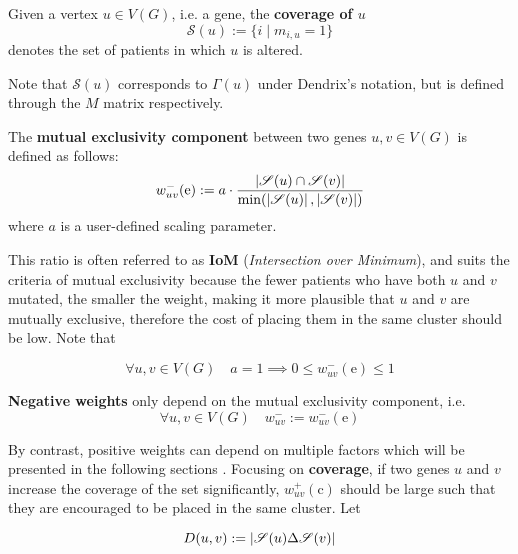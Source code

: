 \begin{definition}
    Given a vertex $u \in V(G)$, i.e. a gene, the \textbf{coverage of $u$} $$\mathscr{S}(u) := \{i \mid m_{i, u} = 1\}$$ denotes the set of patients in which $u$ is altered.
\end{definition}

Note that $\mathscr{S}(u)$ corresponds to $\Gamma(u)$ under Dendrix's notation, but is defined through the $M$ matrix respectively.

\begin{definition} \label{me_comp}
    The \textbf{mutual exclusivity component} between two genes $u, v \in V(G)$ is defined as follows: $$w_{uv}^-(\mathrm e) := a \cdot \dfrac{\left|\mathscr{S}(u) \cap \mathscr{S}(v)\right|}{\min(\left|\mathscr{S}(u)\right|, \left|\mathscr{S}(v)\right|)}$$ where $a$ is a user-defined scaling parameter.
\end{definition}

This ratio is often referred to as \textbf{IoM} (\textit{Intersection over Minimum}), and suits the criteria of mutual exclusivity because the fewer patients who have both $u$ and $v$ mutated, the smaller the weight, making it more plausible that $u$ and $v$ are mutually exclusive, therefore the cost of placing them in the same cluster should be low. Note that

\begin{equation}\label{neg_weight_constraint}
    \forall u, v \in V(G) \quad a = 1 \implies 0 \le w_{uv}^-(\mathrm e) \le 1
\end{equation}

\begin{definition} \label{neg_weights}
    \textbf{Negative weights} only depend on the mutual exclusivity component, i.e. $$\forall u, v \in V(G) \quad w_{uv}^- := w_{uv}^-(\mathrm e)$$
\end{definition}

By contrast, positive weights can depend on multiple factors which will be presented in the following sections . Focusing on \textbf{coverage}, if two genes $u$ and $v$ increase the coverage of the set significantly, $w_{uv}^+(\mathrm c)$ should be large such that they are encouraged to be placed in the same cluster. Let

\begin{equation}
    D(u, v) := \left|\mathscr{S}(u) \Delta \mathscr{S}(v)\right|
\end{equation}

